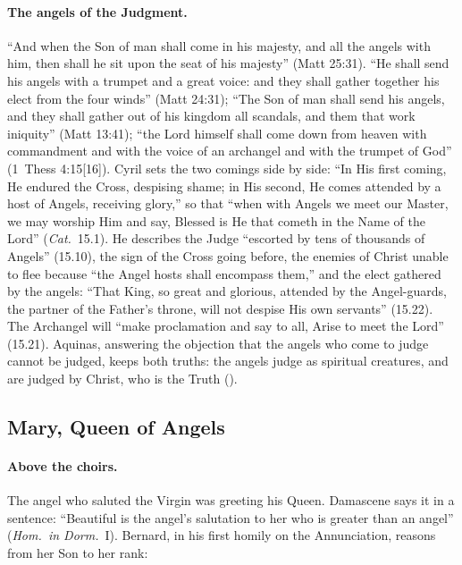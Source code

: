 \paragraph{The angels of the Judgment.} ``And when the Son of man shall come
in his majesty, and all the angels with him, then shall he sit upon the seat
of his majesty'' (Matt 25:31). ``He shall send his angels with a trumpet and
a great voice: and they shall gather together his elect from the four
winds'' (Matt 24:31); ``The Son of man shall send his angels, and they shall
gather out of his kingdom all scandals, and them that work iniquity'' (Matt
13:41); ``the Lord himself shall come down from heaven with commandment and
with the voice of an archangel and with the trumpet of God'' (1~Thess
4:15[16]). Cyril sets the two comings side by side: ``In His first coming,
He endured the Cross, despising shame; in His second, He comes attended by a
host of Angels, receiving glory,'' so that ``when with Angels we meet our
Master, we may worship Him and say, Blessed is He that cometh in the Name of
the Lord'' (\emph{Cat.}\ 15.1). He describes the Judge ``escorted by tens of
thousands of Angels'' (15.10), the sign of the Cross going before, the
enemies of Christ unable to flee because ``the Angel hosts shall encompass
them,'' and the elect gathered by the angels: ``That King, so great and
glorious, attended by the Angel-guards, the partner of the Father's throne,
will not despise His own servants'' (15.22). The Archangel will ``make
proclamation and say to all, Arise to meet the Lord'' (15.21). Aquinas,
answering the objection that the angels who come to judge cannot be judged,
keeps both truths: the angels judge as spiritual creatures, and are judged
by Christ, who is the Truth ().

\sectionguard
\subsection{Mary, Queen of Angels}\label{sec:cm-queen}

\paragraph{Above the choirs.} The angel who saluted the Virgin was greeting
his Queen. Damascene says it in a sentence: ``Beautiful is the angel's
salutation to her who is greater than an angel'' (\emph{Hom.\ in Dorm.}\
I). Bernard, in his first homily on the Annunciation, reasons from her Son
to her rank:

